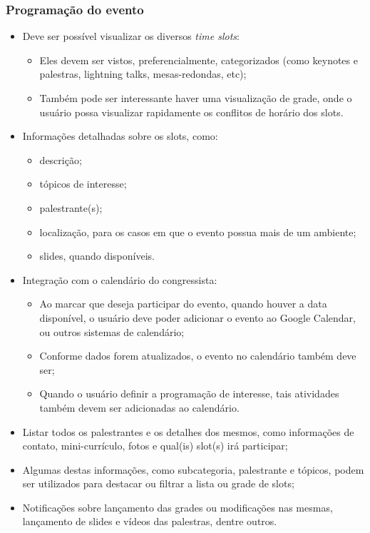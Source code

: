 \documentclass[12pt,a4paper,twoside,hyphens,english,brazil]{abntex2}
\begin{document}
\subsubsection*{Programação do evento}
\begin{itemize}
	\item Deve ser possível visualizar os diversos \emph{time slots}:
		\begin{itemize}
			\item Eles devem ser vistos, preferencialmente, categorizados (como keynotes e palestras, lightning talks, mesas-redondas, etc);
			\item Também pode ser interessante haver uma visualização de grade, onde o usuário possa visualizar rapidamente os conflitos de horário dos slots.
		\end{itemize}
	\item Informações detalhadas sobre os slots, como:
		\begin{itemize}
			\item descrição;
			\item tópicos de interesse;
			\item palestrante(s);
			\item localização, para os casos em que o evento possua mais de um ambiente;
			\item slides, quando disponíveis.
		\end{itemize}
	\item Integração com o calendário do congressista:
		\begin{itemize}
			\item Ao marcar que deseja participar do evento, quando houver a data disponível, o usuário deve poder adicionar o evento ao Google Calendar, ou outros sistemas de calendário;
			\item Conforme dados forem atualizados, o evento no calendário também deve ser;
			\item Quando o usuário definir a programação de interesse, tais atividades também devem ser adicionadas ao calendário.
		\end{itemize}
	\item Listar todos os palestrantes e os detalhes dos mesmos, como informações de contato, mini-currículo, fotos e qual(is) slot(s) irá participar;
	\item Algumas destas informações, como subcategoria, palestrante e tópicos, podem ser utilizados para destacar ou filtrar a lista ou grade de slots;
	\item Notificações sobre lançamento das grades ou modificações nas mesmas, lançamento de slides e vídeos das palestras, dentre outros.
\end{itemize}
\end{document}
